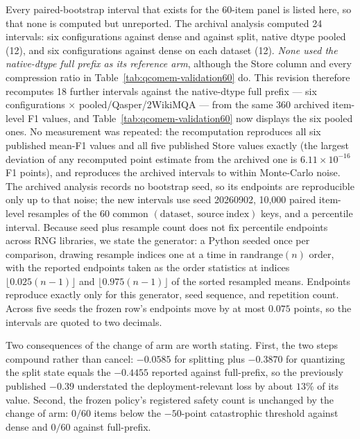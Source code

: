 \documentclass{article}
\begin{document}
Every paired-bootstrap interval that exists for the 60-item panel is listed
here, so that none is computed but unreported.  The archival analysis computed
24 intervals: six configurations against dense and against split, native dtype pooled
(12), and six configurations against dense on each dataset (12).  \emph{None
used the native-dtype full prefix as its reference arm}, although the Store column and every
compression ratio in Table~\ref{tab:qcomem-validation60} do.  This revision
therefore recomputes 18 further intervals against the native-dtype full prefix --- six
configurations $\times$ pooled/Qasper/2WikiMQA --- from the same 360 archived
item-level F1 values, and Table~\ref{tab:qcomem-validation60} now displays the
six pooled ones.  No measurement was repeated: the recomputation reproduces all
six published mean-F1 values and all five published Store values exactly (the
largest deviation of any recomputed point estimate from the archived one is
$6.11\times10^{-16}$ F1 points), and reproduces the archived intervals to
within Monte-Carlo noise.  The archived analysis records no bootstrap seed, so
its endpoints are reproducible only up to that noise; the new intervals use
seed 20260902, 10,000 paired item-level resamples of the 60 common
$(\mathrm{dataset},\ \mathrm{source\ index})$ keys, and a percentile interval.
Because seed plus resample count does not fix percentile endpoints across RNG
libraries, we state the generator: a Python  seeded once per
comparison, drawing resample indices one at a time in
$\mathrm{randrange}(n)$ order, with the reported endpoints taken as the
order statistics at indices $\lfloor 0.025(n-1)\rfloor$ and
$\lfloor 0.975(n-1)\rfloor$ of the sorted resampled means.  Endpoints reproduce
exactly only for this generator, seed sequence, and repetition count.
Across five seeds the frozen row's endpoints move by at most $0.075$ points, so
the intervals are quoted to two decimals.

Two consequences of the change of arm are worth stating.  First, the two steps
compound rather than cancel: $-0.0585$ for splitting plus $-0.3870$ for
quantizing the split state equals the $-0.4455$ reported against full-prefix,
so the previously published $-0.39$ understated the deployment-relevant loss by
about $13\%$ of its value.  Second, the frozen policy's registered safety count
is unchanged by the change of arm: $0/60$ items below the $-50$-point
catastrophic threshold against dense and $0/60$ against full-prefix.
\end{document}

